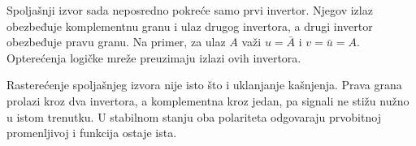 
Spoljašnji izvor sada neposredno pokreće samo prvi invertor. Njegov izlaz obezbeđuje komplementnu granu i ulaz drugog invertora, a drugi invertor obezbeđuje pravu granu. Na primer, za ulaz \(A\) važi \(u=\bar A\) i \(v=\bar u=A\). Opterećenja logičke mreže preuzimaju izlazi ovih invertora.

Rasterećenje spoljašnjeg izvora nije isto što i uklanjanje kašnjenja. Prava grana prolazi kroz dva invertora, a komplementna kroz jedan, pa signali ne stižu nužno u istom trenutku. U stabilnom stanju oba polariteta odgovaraju prvobitnoj promenljivoj i funkcija ostaje ista.
